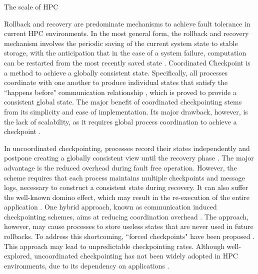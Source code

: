 
The scale of HPC 

Rollback and recovery are predominate mechanisms to achieve fault
tolerance in current HPC environments. In the most general form, the rollback and recovery mechanism
involves the periodic saving of the current system state to stable storage, with the anticipation that
in the case of a system failure, computation can be restarted from the most recently saved state \cite{Elnozahy:02:Survey}. %
Coordinated
Checkpoint is a method to achieve a globally consistent state. Specifically, all processes
coordinate with one another to produce individual states that satisfy the ``happens before"
communication relationship \cite{chandy_trans_1972}, which is proved to provide a consistent global state.
The major benefit of coordinated
checkpointing stems from its simplicity and ease of implementation. Its major drawback, however, is the
lack of scalability, as it requires global process coordination to achieve a checkpoint 
\cite{elnozahy_dsc_2004,riesen_sandia_2010,hargrove2006berkeley}.


In uncoordinated checkpointing, processes record their states independently and postpone creating a 
globally consistent view until the recovery phase \cite{plank_ftc_1999}. The major advantage is the reduced overhead during fault free operation. However, the scheme requires that
each process maintains multiple checkpoints and message logs, necessary to construct a consistent 
state during recovery. It can also suffer the well-known domino effect, which may result in the 
re-execution of the entire application \cite{randell_domino_effect}. One hybrid approach, known as communication induced 
checkpointing schemes, aims at reducing coordination overhead \cite{alvisi_ftc_1999}. The approach, however, may 
cause processes to store useless states that are never used in future rollbacks. To address this 
shortcoming, ``forced checkpoints" have been proposed \cite{helary_rds_1997}. This approach may lead to unpredictable
checkpointing rates. Although well-explored, uncoordinated checkpointing has not been widely adopted
in HPC environments, due to its dependency on applications \cite{zheng_2004_ftccharm,guermouche_2011_ipdps}.


